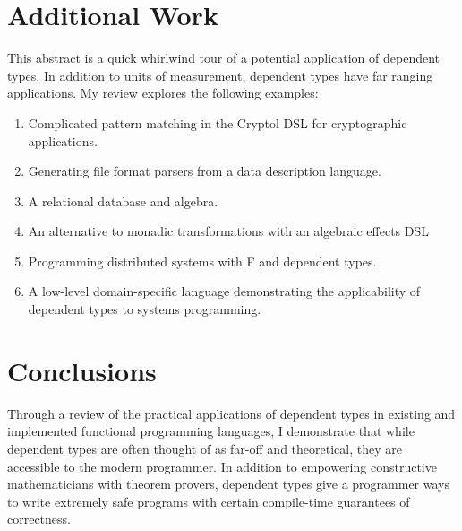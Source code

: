\section{Additional Work}
This abstract is a quick whirlwind tour of a potential application of dependent
types. In addition to units of measurement, dependent types have far ranging
applications. My review explores the following examples: 
\begin{enumerate}
  \item Complicated pattern matching in the Cryptol DSL for cryptographic
  applications. \cite{power_of_pi}
  \item Generating file format parsers from a data description language.
  \cite{power_of_pi}
  \item A relational database and algebra. \cite{power_of_pi, eisenberg2016}
  \item An alternative to monadic transformations with an algebraic effects DSL
  \cite{algebraic}
  \item Programming distributed systems with F\* and dependent types.
  \cite{fstar_distributed_programming}
  \item A low-level domain-specific language demonstrating the applicability of
  dependent types to systems programming. \cite{idris_systems_programming}
\end{enumerate}
\section{Conclusions}
Through a review of the practical applications of dependent types in existing
and implemented functional programming languages, I demonstrate that while
dependent types are often thought of as far-off and theoretical, they are
accessible to the modern programmer. In addition to empowering constructive
mathematicians with theorem provers, dependent types give a programmer ways to
write extremely safe programs with certain compile-time guarantees of
correctness. 
